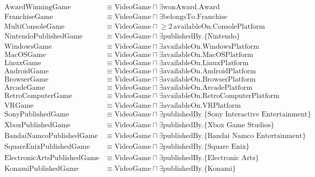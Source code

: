 \begin{align*}
\text{AwardWinningGame}     &\equiv \text{VideoGame} \sqcap \exists\text{wonAward.Award} \\
\text{FranchiseGame}        &\equiv \text{VideoGame} \sqcap \exists\text{belongsTo.Franchise} \\
\text{MultiConsoleGame}     &\equiv \text{VideoGame} \sqcap \mathopen{\geq}2\,\text{availableOn.ConsolePlatform} \\
\text{NintendoPublishedGame} &\equiv \text{VideoGame} \sqcap \exists\text{publishedBy.}\{\text{Nintendo}\} \\
\text{WindowsGame} &\equiv \text{VideoGame} \sqcap \exists\text{availableOn.WindowsPlatform} \\
\text{MacOSGame} &\equiv \text{VideoGame} \sqcap \exists\text{availableOn.MacOSPlatform} \\
\text{LinuxGame} &\equiv \text{VideoGame} \sqcap \exists\text{availableOn.LinuxPlatform} \\
\text{AndroidGame} &\equiv \text{VideoGame} \sqcap \exists\text{availableOn.AndroidPlatform} \\
\text{BrowserGame} &\equiv \text{VideoGame} \sqcap \exists\text{availableOn.BrowserPlatform} \\
\text{ArcadeGame} &\equiv \text{VideoGame} \sqcap \exists\text{availableOn.ArcadePlatform} \\
\text{RetroComputerGame} &\equiv \text{VideoGame} \sqcap \exists\text{availableOn.RetroComputerPlatform} \\
\text{VRGame} &\equiv \text{VideoGame} \sqcap \exists\text{availableOn.VRPlatform} \\
\text{SonyPublishedGame} &\equiv \text{VideoGame} \sqcap \exists\text{publishedBy.}\{\text{Sony Interactive Entertainment}\} \\
\text{XboxPublishedGame} &\equiv \text{VideoGame} \sqcap \exists\text{publishedBy.}\{\text{Xbox Game Studios}\} \\
\text{BandaiNamcoPublishedGame} &\equiv \text{VideoGame} \sqcap \exists\text{publishedBy.}\{\text{Bandai Namco Entertainment}\} \\
\text{SquareEnixPublishedGame} &\equiv \text{VideoGame} \sqcap \exists\text{publishedBy.}\{\text{Square Enix}\} \\
\text{ElectronicArtsPublishedGame} &\equiv \text{VideoGame} \sqcap \exists\text{publishedBy.}\{\text{Electronic Arts}\} \\
\text{KonamiPublishedGame} &\equiv \text{VideoGame} \sqcap \exists\text{publishedBy.}\{\text{Konami}\} \\

\end{align*}
